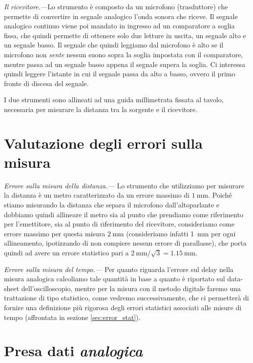 \documentclass[
    prl,
    reprint, 
    superscriptaddress, 
    altaffilletter, 
    amsmath, 
    amssymb, 
    a4paper,
    varvw]{revtex4-2}
\begin{document}
\textit{Il ricevitore.---}Lo strumento è composto da un microfono (trasduttore) che permette di convertire in segnale analogico l'onda sonora che riceve. Il segnale analogico continuo viene poi mandato in ingresso ad un comparatore a soglia fissa\iffalse(automaticamente impostata ad un valore di \SI{00}{\volt})\fi, che quindi permette di ottenere solo due letture in uscita, un segnale alto e un segnale basso. Il segnale che quindi leggiamo dal microfono è alto se il microfono non \emph{sente} nessun suono sopra la soglia impostata con il comparatore, mentre passa ad un segnale basso appena il segnale supera la soglia. Ci interessa quindi leggere l'istante in cui il segnale passa da alto a basso, ovvero il primo fronte di discesa del segnale. 

I due strumenti sono allineati ad una guida millimetrata fissata al tavolo, necessaria per misurare la distanza tra la sorgente e il ricevitore. 

\section{Valutazione degli errori sulla misura}
\textit{Errore sulla misura della distanza.---} Lo strumento che utilizziamo per misurare la distanza è un metro caratterizzato da un errore massimo di $\SI{1}{\milli\metre}$. Poiché stiamo misurando la distanza che separa il microfono dall'altoparlante e dobbiamo quindi allineare il metro sia al punto che prendiamo come riferimento per l'emettitore, sia al punto di riferimento del ricevitore, consideriamo come errore massimo per questa misura $\SI{2}{\milli\metre}$ (consideriamo infatti \SI{1}{\milli\metre} per ogni allineamento, ipotizzando di non compiere nessun errore di parallasse), che porta quindi ad avere un errore statistico pari a $\SI{2}{\milli\metre}/\sqrt{3} = \SI{1.15}{\milli\metre}$.

\textit{Errore sulla misura del tempo.---} Per quanto riguarda l'errore sul delay nella misura analogica calcoliamo tale quantità in base a quanto è riportato sul data-sheet dell'oscilloscopio, mentre per la misura con il metodo digitale faremo una trattazione di tipo statistico, come vedremo successivamente, che ci permetterà di fornire una definizione più rigorosa degli errori statistici associati alle misure di tempo (affrontata in sezione \ref{sec:error_stat}).


\section{Presa dati \emph{analogica}}
\end{document}
